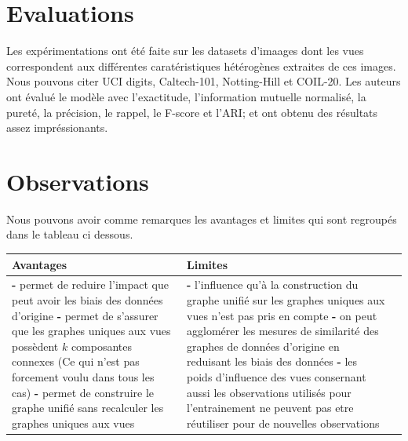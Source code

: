 \documentclass[12pt, french, latin.medieval, a4paper]{report}
\begin{document}
	\section{Evaluations}

    Les expérimentations ont été faite sur les datasets d'imaages dont les vues correspondent aux différentes caratéristiques hétérogènes extraites de ces images. Nous pouvons citer UCI digits, Caltech-101, Notting-Hill et COIL-20.
    Les auteurs ont évalué le modèle avec l'exactitude, l'information mutuelle normalisé, la pureté, la précision, le rappel, le F-score et l'ARI; et ont obtenu des résultats assez impréssionants.
    
    \section{Observations}
    Nous pouvons avoir comme remarques les avantages et limites qui sont regroupés dans le tableau ci dessous.
    \begin{center}
        \begin{longtable}{|p{5cm}|p{5cm}|p{4.5cm}|} \hline
            {Avantages} & {Limites}  \\
            \hline
                {\textbf{-} permet de reduire l'impact que peut avoir les biais des données d'origine} \newline
                {\textbf{-} permet de s'assurer que les graphes uniques aux vues possèdent $k$ composantes connexes (Ce qui n'est pas forcement voulu dans tous les cas) } \newline
                {\textbf{-} permet de construire le graphe unifié sans recalculer les graphes uniques aux vues }
                    &
                {\textbf{-}  l'influence qu'à la construction du graphe unifié sur les graphes uniques aux vues n'est pas pris en compte } \newline
                {\textbf{-}  on peut agglomérer les mesures de similarité des graphes de données d'origine en reduisant les biais des données }\newline
                {\textbf{-}  les poids d'influence des vues consernant aussi les observations utilisés pour l'entrainement ne peuvent pas etre réutiliser pour de nouvelles observations }
                \\
            \hline
        \end{longtable}
    \end{center}
\end{document}
